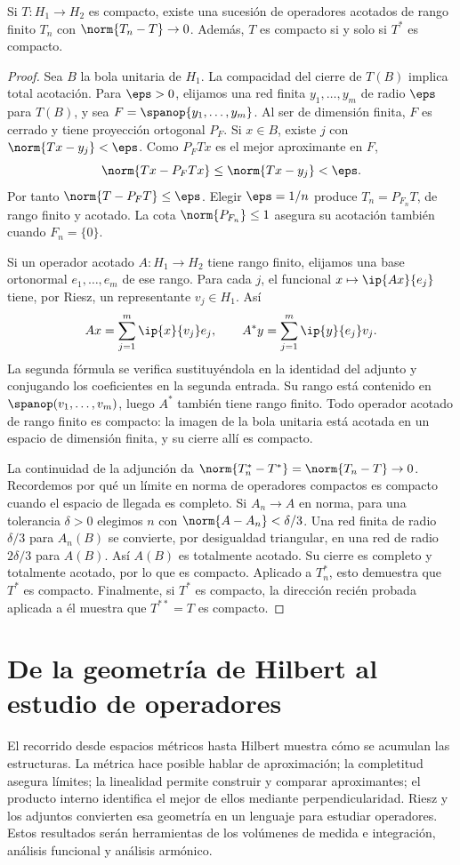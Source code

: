 \begin{teorema}\label{ch32:compactos}
Si $T:H_1\to H_2$ es compacto, existe una sucesión de operadores acotados de rango finito $T_n$ con $\norm{T_n-T}\to0$. Además, $T$ es compacto si y solo si $T^*$ es compacto.
\end{teorema}
\begin{proof}
Sea $B$ la bola unitaria de $H_1$. La compacidad del cierre de $T(B)$ implica total acotación. Para $\eps>0$, elijamos una red finita $y_1,\dots,y_m$ de radio $\eps$ para $T(B)$, y sea $F=\spanop\{y_1,\dots,y_m\}$. Al ser de dimensión finita, $F$ es cerrado y tiene proyección ortogonal $P_F$. Si $x\in B$, existe $j$ con $\norm{Tx-y_j}<\eps$. Como $P_FTx$ es el mejor aproximante en $F$,
\[
 \norm{Tx-P_FTx}\leq\norm{Tx-y_j}<\eps.
\]
Por tanto $\norm{T-P_FT}\leq\eps$. Elegir $\eps=1/n$ produce $T_n=P_{F_n}T$, de rango finito y acotado. La cota $\norm{P_{F_n}}\leq1$ asegura su acotación también cuando $F_n=\{0\}$.

Si un operador acotado $A:H_1\to H_2$ tiene rango finito, elijamos una base ortonormal $e_1,\dots,e_m$ de ese rango. Para cada $j$, el funcional $x\mapsto\ip{Ax}{e_j}$ tiene, por Riesz, un representante $v_j\in H_1$. Así
\[
 Ax=\sum_{j=1}^{m}\ip{x}{v_j}e_j,
 \qquad A^*y=\sum_{j=1}^{m}\ip{y}{e_j}v_j.
\]
La segunda fórmula se verifica sustituyéndola en la identidad del adjunto y conjugando los coeficientes en la segunda entrada. Su rango está contenido en $\spanop(v_1,\dots,v_m)$, luego $A^*$ también tiene rango finito. Todo operador acotado de rango finito es compacto: la imagen de la bola unitaria está acotada en un espacio de dimensión finita, y su cierre allí es compacto.

La continuidad de la adjunción da $\norm{T_n^*-T^*}=\norm{T_n-T}\to0$. Recordemos por qué un límite en norma de operadores compactos es compacto cuando el espacio de llegada es completo. Si $A_n\to A$ en norma, para una tolerancia $\delta>0$ elegimos $n$ con $\norm{A-A_n}<\delta/3$. Una red finita de radio $\delta/3$ para $A_n(B)$ se convierte, por desigualdad triangular, en una red de radio $2\delta/3$ para $A(B)$. Así $A(B)$ es totalmente acotado. Su cierre es completo y totalmente acotado, por lo que es compacto. Aplicado a $T_n^*$, esto demuestra que $T^*$ es compacto. Finalmente, si $T^*$ es compacto, la dirección recién probada aplicada a él muestra que $T^{**}=T$ es compacto.
\end{proof}

\section{De la geometría de Hilbert al estudio de operadores}
El recorrido desde espacios métricos hasta Hilbert muestra cómo se acumulan las estructuras. La métrica hace posible hablar de aproximación; la completitud asegura límites; la linealidad permite construir y comparar aproximantes; el producto interno identifica el mejor de ellos mediante perpendicularidad. Riesz y los adjuntos convierten esa geometría en un lenguaje para estudiar operadores. Estos resultados serán herramientas de los volúmenes de medida e integración, análisis funcional y análisis armónico.

